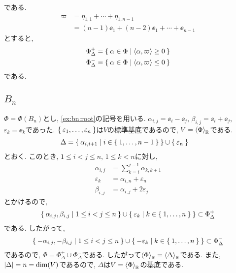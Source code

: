 である.
\begin{align*}
  \varpi&=\eta_{1,1}+\cdots+\eta_{1,n-1}\\
  &=(n-1)\ee_1+(n-2)\ee_1+\cdots+\ee_{n-1}
\end{align*}
  とすると,
\begin{align*}
\Phi_\Delta^+&=\Set{\alpha\in\Phi|\Braket{\alpha,\varpi}\geq 0}\\
\Phi_\Delta^-&=\Set{\alpha\in\Phi|\Braket{\alpha,\varpi}\leq 0}
\end{align*}
である.


\subsection{$B_{n}$}
\label{ex:bn:simple}
$\Phi=\Phi(B_n)$とし,
\cref{ex:bn:root}の記号を用いる.
$\alpha_{i,j}=\ee_i-\ee_j$,
$\beta_{i,j}=\ee_i+\ee_j$,
$\varepsilon_{k}=\ee_k$であった.
$\Set{\varepsilon_{1},\ldots,\varepsilon_n}$は$V$の標準基底であるので,
$V=\Braket{\Phi}_{\mathbb{R}}$である.
\begin{align*}
  \Delta&=\Set{\alpha_{i,i+1}|i\in\Set{1,\ldots,n-1}}\cup \Set{\varepsilon_n}
\end{align*}
とおく.
このとき, $1\leq i<j\leq n$, $1\leq k<n$に対し,
\begin{align*}
\alpha_{i,j}&=\sum_{k=i}^{j-1}\alpha_{k,k+1}\\
\varepsilon_{k}&=\alpha_{i,n}+\varepsilon_{n}\\
\beta_{i,j}&=\alpha_{i,j}+2\varepsilon_{j}
\end{align*}
とかけるので,
\begin{align*}
  \Set{\alpha_{i,j},\beta_{i,j}|1\leq i<j\leq n}\cup \Set{\varepsilon_k | k\in\Set{1,\ldots,n}}\subset\Phi_\Delta^+
\end{align*}
である.
したがって,
\begin{align*}
  \Set{-\alpha_{i,j},-\beta_{i,j}|1\leq i<j\leq n}\cup \Set{-\varepsilon_k | k\in\Set{1,\ldots,n}}\subset\Phi_\Delta^-
\end{align*}
であるので, $\Phi=\Phi_\Delta^+\cup \Phi_\Delta^-$である.  したがって$\Braket{\Phi}_{\mathbb{R}}=\Braket{\Delta}_{\mathbb{R}}$である.
また, $\left|\Delta\right|=n=\dim(V)$であるので, $\Delta$は$V=\Braket{\Phi}_{\mathbb{R}}$の基底である.

